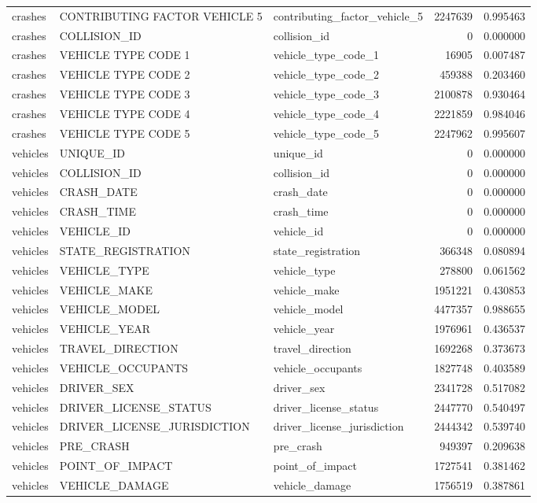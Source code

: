 \begin{tabular}{lllrr}
crashes & CONTRIBUTING FACTOR VEHICLE 5 & contributing_factor_vehicle_5 & 2247639 & 0.995463 \\
crashes & COLLISION_ID & collision_id & 0 & 0.000000 \\
crashes & VEHICLE TYPE CODE 1 & vehicle_type_code_1 & 16905 & 0.007487 \\
crashes & VEHICLE TYPE CODE 2 & vehicle_type_code_2 & 459388 & 0.203460 \\
crashes & VEHICLE TYPE CODE 3 & vehicle_type_code_3 & 2100878 & 0.930464 \\
crashes & VEHICLE TYPE CODE 4 & vehicle_type_code_4 & 2221859 & 0.984046 \\
crashes & VEHICLE TYPE CODE 5 & vehicle_type_code_5 & 2247962 & 0.995607 \\
vehicles & UNIQUE_ID & unique_id & 0 & 0.000000 \\
vehicles & COLLISION_ID & collision_id & 0 & 0.000000 \\
vehicles & CRASH_DATE & crash_date & 0 & 0.000000 \\
vehicles & CRASH_TIME & crash_time & 0 & 0.000000 \\
vehicles & VEHICLE_ID & vehicle_id & 0 & 0.000000 \\
vehicles & STATE_REGISTRATION & state_registration & 366348 & 0.080894 \\
vehicles & VEHICLE_TYPE & vehicle_type & 278800 & 0.061562 \\
vehicles & VEHICLE_MAKE & vehicle_make & 1951221 & 0.430853 \\
vehicles & VEHICLE_MODEL & vehicle_model & 4477357 & 0.988655 \\
vehicles & VEHICLE_YEAR & vehicle_year & 1976961 & 0.436537 \\
vehicles & TRAVEL_DIRECTION & travel_direction & 1692268 & 0.373673 \\
vehicles & VEHICLE_OCCUPANTS & vehicle_occupants & 1827748 & 0.403589 \\
vehicles & DRIVER_SEX & driver_sex & 2341728 & 0.517082 \\
vehicles & DRIVER_LICENSE_STATUS & driver_license_status & 2447770 & 0.540497 \\
vehicles & DRIVER_LICENSE_JURISDICTION & driver_license_jurisdiction & 2444342 & 0.539740 \\
vehicles & PRE_CRASH & pre_crash & 949397 & 0.209638 \\
vehicles & POINT_OF_IMPACT & point_of_impact & 1727541 & 0.381462 \\
vehicles & VEHICLE_DAMAGE & vehicle_damage & 1756519 & 0.387861 \\

\end{tabular}
